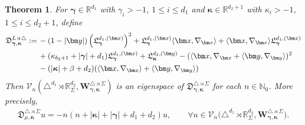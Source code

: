 \documentclass{amsart}
\newtheorem{thm}{Theorem}[section]
\theoremstyle{remark}
\def\la{{\langle}}
\def\ra{{\rangle}}
\def\fD{{\mathfrak D}}
\def\fL{{\mathfrak L}}
\def\b{{\beta}}
\def\g{{\gamma}}
\def\k{{\kappa}}
\def\la{{\langle}}
\def\ra{{\rangle}}
\def\xb{{\bm x}}
\def\yb{{\bm y}}
\def\CV{{\mathcal V}}
\def\NN{{\mathbb N}}
\def\RR{{\mathbb R}}
\def\bg{{\boldsymbol{\gamma}}}
\def\bk{{\boldsymbol{\kappa}}}
\begin{document}
\begin{thm}\label{thm:LSimplex}
For $\bg \in \RR^{d_1}$ with $\g_i  > -1$, $1\le i \le d_1$ and $\bk \in \RR^{d_2+1}$ with $\k_i > -1$, $1 \le i \le d_2+1$, 
define
\begin{align} \label{eq:LSimplex}
\fD_{\bg,\bk}^{L \rtimes \triangle}  : =\,& -(1-|\yb|) \left(\fL_\bg^{d_1, (\xb)}\right)^2 + \fL_\bg^{d_1, (\xb)} \la \xb, \nabla_\xb\ra+\la \xb, \nabla_\xb\ra \fL_\bg^{d_1, (\xb)} \\
 & +(\k_{b_2+1} + |\bg| +d_1) \fL_\bg^{d_1, (\xb)} +  \fL_\bk^{d_2, (\yb)} - (\la \xb, \nabla_{\xb} +\la \bm y, \nabla_{\bm y}\ra)^2 
 \notag \\
 &     - (|\bk|+\b+ d_2) ( \la \bm x, \nabla_{\bm x} \ra +\la \bm y, \nabla_{\bm y} \ra)  \notag 
 \end{align}
Then $\CV_n(\triangle^{d_1}  \rtimes \RR_\Sigma^{d_2}, \bm W_{\bg, \bk}^{\triangle \rtimes \Sigma})$ is an eigenspace 
of $ \fD_{\bg,\bk}^{\triangle \rtimes \Sigma}$ for each $n \in \NN_0$. More precisely, 
\begin{align} \label{eq:LSimplex-eigen}
  \fD_{\mu,\bk}^{\triangle \rtimes \Sigma} u =  - n (n + |\bk|+ |\bg|+d_1+d_2) u, \qquad \forall u \in \CV_n\big(\triangle^{d_1}  \rtimes \RR_\Sigma^{d_2}, \bm W_{\bg, \bk}^{\triangle \rtimes \Sigma}\big).
\end{align}
\end{thm}
\end{document}
